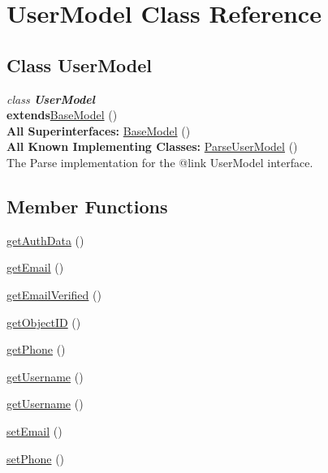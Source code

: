 \hypertarget{class_UserModel.Android}{\section{UserModel Class Reference}
\label{class_UserModel.Android}
}

\subsection*{Class UserModel}

\textit{class \textbf{UserModel}}\\
\tab \textbf{extends}\hyperlink{class_BaseModel.Android}{BaseModel} ()\\


\textbf{All Superinterfaces:}
\tab  \hyperlink{class_BaseModel.Android}{BaseModel} ()\\

\textbf{All Known Implementing Classes:}
\tab  \hyperlink{class_ParseUserModel.Android}{ParseUserModel} ()\\

The Parse implementation for the @{link UserModel} interface.

\subsection*{Member Functions}
\begin{DoxyCompactItemize}
\item 
\hyperlink{class_UserModel.Android.getAuthData}{getAuthData} ()
\item 
\hyperlink{class_UserModel.Android.getEmail}{getEmail} ()
\item 
\hyperlink{class_UserModel.Android.getEmailVerified}{getEmailVerified} ()
\item 
\hyperlink{class_UserModel.Android.getObjectID}{getObjectID} ()
\item 
\hyperlink{class_UserModel.Android.getPhone}{getPhone} ()
\item 
\hyperlink{class_UserModel.Android.getUsername}{getUsername} ()
\item 
\hyperlink{class_UserModel.Android.getUsername2}{getUsername} ()
\item 
\hyperlink{class_UserModel.Android.setEmail}{setEmail} ()
\item 
\hyperlink{class_UserModel.Android.sePhone}{setPhone} ()
\end{DoxyCompactItemize}




